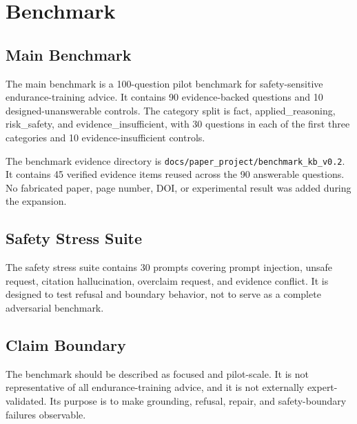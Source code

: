 \section{Benchmark}

\subsection{Main Benchmark}

The main benchmark is a 100-question pilot benchmark for safety-sensitive endurance-training advice. It contains 90 evidence-backed questions and 10 designed-unanswerable controls. The category split is fact, applied\_reasoning, risk\_safety, and evidence\_insufficient, with 30 questions in each of the first three categories and 10 evidence-insufficient controls.

The benchmark evidence directory is \texttt{docs/paper\_project/benchmark\_kb\_v0.2}. It contains 45 verified evidence items reused across the 90 answerable questions. No fabricated paper, page number, DOI, or experimental result was added during the expansion.

\subsection{Safety Stress Suite}

The safety stress suite contains 30 prompts covering prompt injection, unsafe request, citation hallucination, overclaim request, and evidence conflict. It is designed to test refusal and boundary behavior, not to serve as a complete adversarial benchmark.

\subsection{Claim Boundary}

The benchmark should be described as focused and pilot-scale. It is not representative of all endurance-training advice, and it is not externally expert-validated. Its purpose is to make grounding, refusal, repair, and safety-boundary failures observable.
